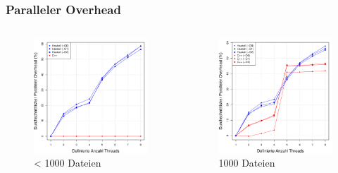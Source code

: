 \documentclass[presentation, shownotes]{beamer}
\begin{document}
\begin{frame}
\frametitle{Paralleler Overhead}
\begin{columns}[c]
    \begin{figure}
        \includegraphics[width=\textwidth]{parallel_overhead_sub1000_desktop.pdf}
        \caption{< 1000 Dateien}
    \end{figure}

    \begin{figure}
        \includegraphics[width=\textwidth]{parallel_overhead_1000_desktop.pdf}
        \caption{1000 Dateien}
    \end{figure}
\end{columns}
\end{frame}
\end{document}
